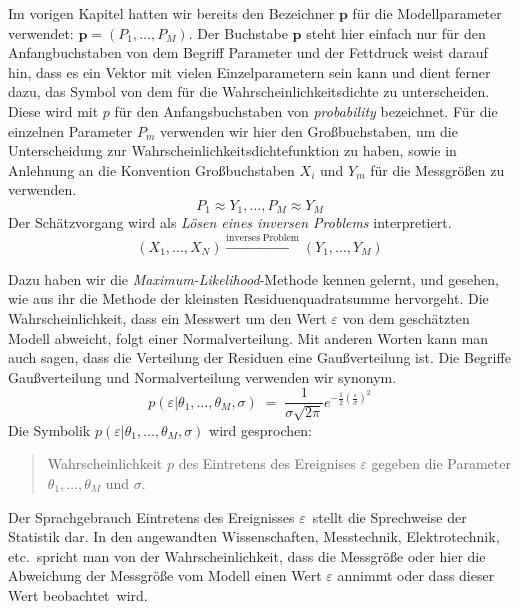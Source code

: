 Im vorigen Kapitel hatten wir bereits den Bezeichner $\mathbf{p}$ für die Modellparameter
verwendet: $\mathbf{p} = (P_1, \dots, P_M)$.
Der Buchstabe $\mathbf{p}$ steht hier einfach nur für den Anfangbuchstaben
von dem Begriff Parameter und der Fettdruck weist darauf hin, dass es ein Vektor mit vielen
Einzelparametern sein kann und dient ferner dazu, das Symbol von dem für die Wahrscheinlichkeitsdichte
zu unterscheiden. Diese wird mit $p$ für den Anfangsbuchstaben von \textsl{probability} bezeichnet.
Für die einzelnen Parameter $P_m$ verwenden wir hier den Großbuchstaben, um die Unterscheidung zur
Wahrscheinlichkeitsdichtefunktion zu haben, sowie in Anlehnung an die Konvention Großbuchstaben
$X_i$ und $Y_m$ für die Messgrößen zu verwenden.
\begin{equation}
P_1 \approx Y_1, \dots, P_M \approx Y_M
\end{equation}
Der Schätzvorgang wird als \textsl{Lösen eines inversen Problems} interpretiert.
\begin{equation}
(X_1, \dots, X_N) \xrightarrow{\mathrm{inverses \; Problem}} (Y_1, \dots, Y_M)
\label{inverseProblem}
\end{equation}

Dazu haben wir die \textsl{Maximum-Likelihood}-Methode kennen gelernt, und gesehen, wie
aus ihr die Methode der kleinsten Residuenquadratsumme hervorgeht. Die Wahrscheinlichkeit,
dass ein Messwert um den Wert $\varepsilon$ von dem geschätzten Modell abweicht, folgt
einer Normalverteilung. Mit anderen Worten kann man auch sagen, dass
die Verteilung der Residuen eine Gaußverteilung ist.
Die Begriffe Gaußverteilung und Normalverteilung verwenden wir synonym.
\begin{equation}
p(\varepsilon | \theta_1,\dots,\theta_M, \sigma) \; = \; \frac{1}{\sigma \sqrt{2 \pi}}
e^{-\frac{1}{2} \left(\frac{\varepsilon}{\sigma}\right)^2}
\label{Maximumlikelihood1}
\end{equation}
Die Symbolik $p(\varepsilon | \theta_1,\dots,\theta_M, \sigma)$ wird gesprochen:
\begin{quote}
Wahrscheinlichkeit $p$ des Eintretens des Ereignises $\varepsilon$
gegeben die Parameter $\theta_1,\dots,\theta_M$ und $\sigma$.
\end{quote}
Der Sprachgebrauch \glqq Eintretens des Ereignisses $\varepsilon$\grqq ~stellt die
Sprechweise der Statistik dar. In den angewandten Wissenschaften, Messtechnik,
Elektrotechnik, etc.\ spricht man von der Wahrscheinlichkeit, dass die Messgröße
oder hier die Abweichung der Messgröße vom Modell einen Wert $\varepsilon$ annimmt oder
dass dieser Wert \glqq beobachtet\grqq ~wird.


